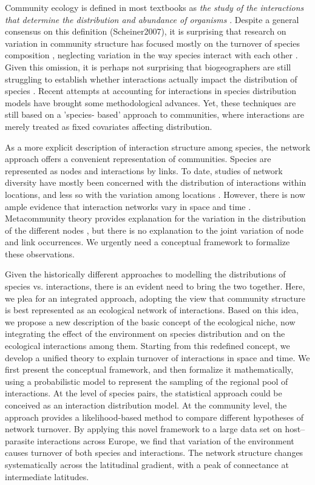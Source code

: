 \documentclass[12pt]{article}
\begin{document}
Community ecology is defined in most textbooks as \textit{the study of the
interactions that determine the distribution and abundance of organisms}
\citep{Krebs2001}. Despite a general consensus on this definition
(Scheiner2007), it is surprising that research on variation in community
structure has focused mostly on the turnover of species composition
\citep{Anderson2011}, neglecting variation in the way species interact with
each other \citep{Poisot2015a}. Given this omission, it is perhaps not
surprising that biogeographers are still struggling to establish whether
interactions actually impact the distribution of species \citep{Wisz2012,
Kissling2012}. Recent attempts at accounting for interactions in species
distribution models \citep{Pollock2014, Pelissier2013} have brought some
methodological advances. Yet, these techniques are still based on a ’species-
based’ approach to communities, where interactions are merely treated as fixed
covariates affecting distribution.

As a more explicit description of interaction structure among species, the
network approach offers a convenient representation of communities. Species
are represented as nodes and interactions by links. To date, studies of
network diversity have mostly been concerned with the distribution of
interactions within locations, and less so with the variation among locations
\citep{Dunne2005, Bascompte2007, Ings2007, Kefi2012}. However, there is now
ample evidence that interaction networks vary in space and time
\citep{Poisot2012, Albouy2014, Poisot2016, Trojelsgaard2015}. Metacommunity
theory provides explanation for the variation in the distribution of the
different nodes \citep{Gravel2011c, Pillai2011}, but there is no explanation
to the joint variation of node and link occurrences. We urgently need a
conceptual framework to formalize these observations.

Given the historically different approaches to modelling the distributions of
species vs. interactions, there is an evident need to bring the two together.
Here, we plea for an integrated approach, adopting the view that community
structure is best represented as an ecological network of interactions. Based
on this idea, we propose a new description of the basic concept of the
ecological niche, now integrating the effect of the environment on species
distribution and on the ecological interactions among them. Starting from this
redefined concept, we develop a unified theory to explain turnover of
interactions in space and time. We first present the conceptual framework, and
then formalize it mathematically, using a probabilistic model to represent the
sampling of the regional pool of interactions. At the level of species pairs,
the statistical approach could be conceived as an interaction distribution
model. At the community level, the approach provides a likelihood-based method
to compare different hypotheses of network turnover. By applying this novel
framework to a large data set on host–parasite interactions across Europe, we
find that variation of the environment causes turnover of both species and
interactions. The network structure changes systematically across the
latitudinal gradient, with a peak of connectance at intermediate latitudes.
\end{document}
